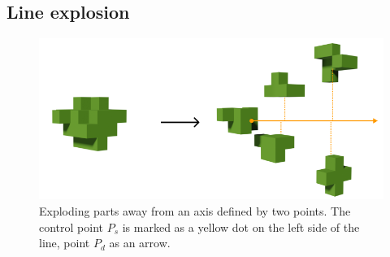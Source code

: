 \subsection{Line explosion} 
\begin{figure}[h]
	\centering
	\includegraphics[width=.65\linewidth]{fig/Images/LineExplosion}
	\caption[]{Exploding parts away from an axis defined by two points. The control point $P_s$ is marked as a yellow dot on the left side of the line, point $P_d$ as an arrow.}
	\label{fig:lineExpl1}
\end{figure}

